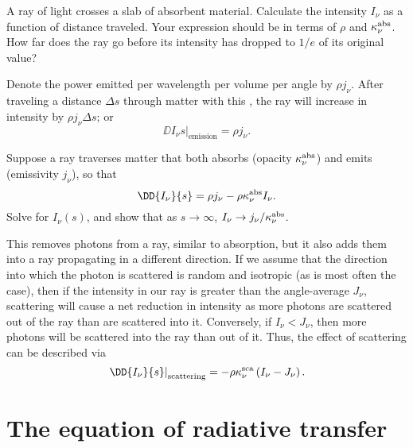 \begin{exercisebox}
A ray of light crosses a slab of absorbent material. Calculate the intensity $I_{\nu}$ as a function of distance traveled. Your expression should be in terms of $\rho$ and $\kappa_\nu^{\mathrm{abs}}$. How far does the ray go before its intensity has dropped to $1/e$ of its original value?
\end{exercisebox}

 Denote the power emitted per wavelength per volume per angle by $\rho j_{\nu}$. After traveling a distance $\Delta s$ through matter with this , the ray will increase in intensity by $\rho j_{\nu}\Delta s$; or
\begin{equation}\label{e.emission-microscopic}
\left.\DD{I_{\nu}}{s}\right|_{\mathrm{emission}} = \rho j_{\nu}.
\end{equation}

\begin{exercisebox}
Suppose a ray traverses matter that both absorbs (opacity $\kappa_\nu^{\mathrm{abs}}$) and emits (emissivity $j_{\nu}$), so that
\[	\DD{I_{\nu}}{s} = \rho j_{\nu} - \rho\kapabs I_{\nu}. \]
Solve for $I_{\nu}(s)$, and show that as $s\to\infty$, $I_{\nu}\to j_{\nu}/\kappa_\nu^{\mathrm{abs}}$.
\label{ex.intensity-at-large-depth}
\end{exercisebox}

 This removes photons from a ray, similar to absorption, but it also adds them into a ray propagating in a different direction. 
If we assume that the direction into which the photon is scattered is random and isotropic (as is most often the case), then if the intensity in our ray is greater than the angle-average $J_{\nu}$, scattering will cause a net reduction in intensity as more photons are scattered out of the ray than are scattered into it. Conversely, if $I_{\nu} < J_{\nu}$, then more photons will be scattered into the ray than out of it. Thus, the effect of scattering can be described via
\begin{equation}\label{e.scattering-microscopic}
\left.\DD{I_{\nu}}{s}\right|_{\mathrm{scattering}} = -\rho\kapscat \left(I_{\nu} - J_{\nu}\right).
\end{equation}

\section{The equation of radiative transfer}
\label{s.equation-radiative-transfer}

